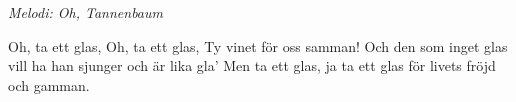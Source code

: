 {\footnotesize\textit{Melodi: Oh, Tannenbaum}}\par
\vspace{10pt}
Oh, ta ett glas,
Oh, ta ett glas,
Ty vinet för oss samman!
Och den som inget glas vill ha
han sjunger och är lika gla'
Men ta ett glas,
ja ta ett glas
för livets fröjd och gamman.
